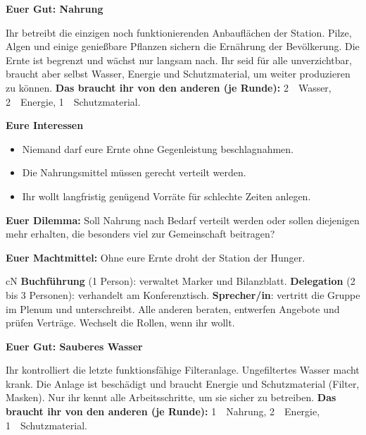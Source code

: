 \newcommand{\rollenbox}[1]{%
\begin{metrobox}[title={Rollen in eurer Gruppe},fonttitle=\bfseries]{#1}
\textbf{Buchführung} (1 Person): verwaltet Marker und Bilanzblatt. \textbf{Delegation} (2 bis 3 Personen): verhandelt am Konferenztisch. \textbf{Sprecher\slash in}: vertritt die Gruppe im Plenum und unterschreibt. Alle anderen beraten, entwerfen Angebote und prüfen Verträge. Wechselt die Rollen, wenn ihr wollt.
\end{metrobox}}

\clearpage
{}
\noindent\textbf{Euer Gut: Nahrung} \rN\par\vspace{1mm}
Ihr betreibt die einzigen noch funktionierenden Anbauflächen der Station. Pilze, Algen und einige genießbare Pflanzen sichern die Ernährung der Bevölkerung. Die Ernte ist begrenzt und wächst nur langsam nach. Ihr seid für alle unverzichtbar, braucht aber selbst Wasser, Energie und Schutzmaterial, um weiter produzieren zu können.
\textbf{Das braucht ihr von den anderen (je Runde):} 2~\rW\ Wasser, 2~\rE\ Energie, 1~\rS\ Schutzmaterial.

\medskip\noindent\textbf{Eure Interessen}
\begin{itemize}
  \item Niemand darf eure Ernte ohne Gegenleistung beschlagnahmen.
  \item Die Nahrungsmittel müssen gerecht verteilt werden.
  \item Ihr wollt langfristig genügend Vorräte für schlechte Zeiten anlegen.
\end{itemize}
\textbf{Euer Dilemma:} Soll Nahrung nach Bedarf verteilt werden oder sollen diejenigen mehr erhalten, die besonders viel zur Gemeinschaft beitragen?\par
\textbf{Euer Machtmittel:} Ohne eure Ernte droht der Station der Hunger.\par\medskip
\rollenbox{cN}

\clearpage
{}
\noindent\textbf{Euer Gut: Sauberes Wasser} \rW\par\vspace{1mm}
Ihr kontrolliert die letzte funktionsfähige Filteranlage. Ungefiltertes Wasser macht krank. Die Anlage ist beschädigt und braucht Energie und Schutzmaterial (Filter, Masken). Nur ihr kennt alle Arbeitsschritte, um sie sicher zu betreiben.
\textbf{Das braucht ihr von den anderen (je Runde):} 1~\rN\ Nahrung, 2~\rE\ Energie, 1~\rS\ Schutzmaterial.

